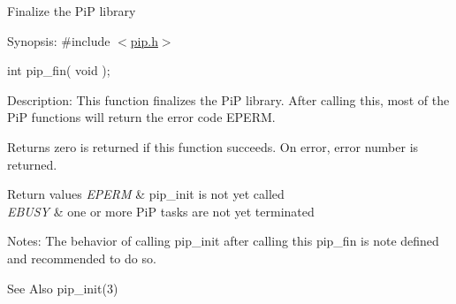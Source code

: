 Finalize the Pi\-P library

\begin{DoxyParagraph}{Synopsis\-:}
\#include $<$\hyperlink{pip_8h_source}{pip.\-h}$>$ \par
int pip\-\_\-fin( void );
\end{DoxyParagraph}
\begin{DoxyParagraph}{Description\-:}
This function finalizes the Pi\-P library. After calling this, most of the Pi\-P functions will return the error code {\ttfamily E\-P\-E\-R\-M}.
\end{DoxyParagraph}
\begin{DoxyReturn}{Returns}
zero is returned if this function succeeds. On error, error number is returned. 
\end{DoxyReturn}

\begin{DoxyRetVals}{Return values}
{\em E\-P\-E\-R\-M} & {\ttfamily pip\-\_\-init} is not yet called \\
\hline
{\em E\-B\-U\-S\-Y} & {\ttfamily one} or more Pi\-P tasks are not yet terminated\\
\hline
\end{DoxyRetVals}
\begin{DoxyParagraph}{Notes\-:}
The behavior of calling {\ttfamily pip\-\_\-init} after calling this {\ttfamily pip\-\_\-fin} is note defined and recommended to do so.
\end{DoxyParagraph}
\par
\par
\begin{DoxySeeAlso}{See Also}
pip\-\_\-init(3) 
\end{DoxySeeAlso}
